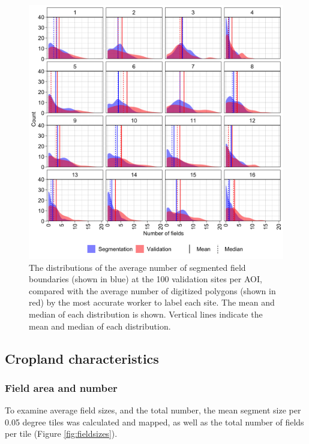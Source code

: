 \documentclass[
  11pt,
  a4paper]{article}
\begin{document}
\begin{figure}[!ht]

{\centering \includegraphics[width=0.9\linewidth,]{figures/si_validation_stats_fn2} 

}

\caption{The distributions of the average number of segmented field boundaries (shown in blue) at the 100 validation sites per AOI, compared with the average number of digitized polygons (shown in red) by the most accurate worker to label each site. The mean and median of each distribution is shown. Vertical lines indicate the mean and median of each distribution.}\label{fig:numbervalidation}
\end{figure}

\hypertarget{cropland-characteristics}{%
\subsection{Cropland characteristics}\label{cropland-characteristics}}

\hypertarget{field-area-and-number-1}{%
\subsubsection{Field area and number}\label{field-area-and-number-1}}

To examine average field sizes, and the total number, the mean segment
size per 0.05 degree tiles was calculated and mapped, as well as the
total number of fields per tile (Figure \ref{fig:fieldsizes}).
\end{document}
